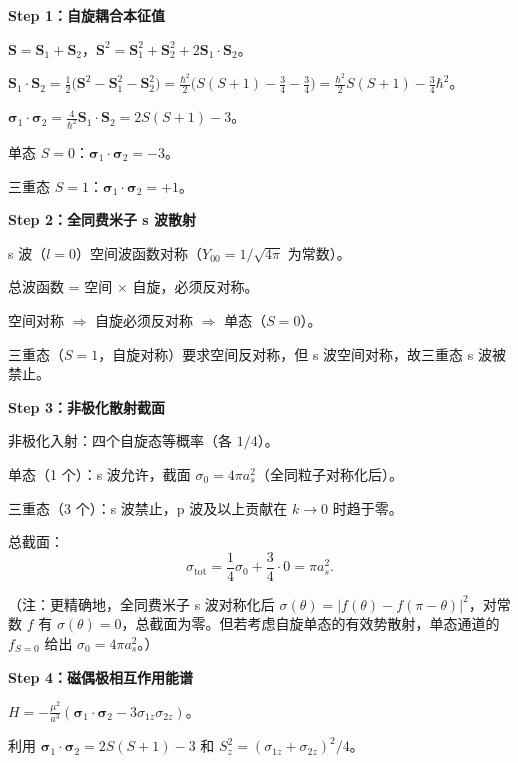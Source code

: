\begin{derivationbox}
\textbf{Step 1：自旋耦合本征值}

$\mathbf{S}=\mathbf{S}_1+\mathbf{S}_2$，$\mathbf{S}^2=\mathbf{S}_1^2+\mathbf{S}_2^2+2\mathbf{S}_1\cdot\mathbf{S}_2$。

$\mathbf{S}_1\cdot\mathbf{S}_2=\frac12\bigl(\mathbf{S}^2-\mathbf{S}_1^2-\mathbf{S}_2^2\bigr)=\frac{\hbar^2}{2}\bigl(S(S+1)-\frac34-\frac34\bigr)=\frac{\hbar^2}{2}S(S+1)-\frac34\hbar^2$。

$\boldsymbol{\sigma}_1\cdot\boldsymbol{\sigma}_2=\frac{4}{\hbar^2}\mathbf{S}_1\cdot\mathbf{S}_2=2S(S+1)-3$。

单态 $S=0$：$\boldsymbol{\sigma}_1\cdot\boldsymbol{\sigma}_2=-3$。

三重态 $S=1$：$\boldsymbol{\sigma}_1\cdot\boldsymbol{\sigma}_2=+1$。

\textbf{Step 2：全同费米子 s 波散射}

s 波（$l=0$）空间波函数对称（$Y_{00}=1/\sqrt{4\pi}$ 为常数）。

总波函数 = 空间 $\times$ 自旋，必须反对称。

空间对称 $\Rightarrow$ 自旋必须反对称 $\Rightarrow$ 单态（$S=0$）。

三重态（$S=1$，自旋对称）要求空间反对称，但 s 波空间对称，故三重态 s 波被禁止。

\textbf{Step 3：非极化散射截面}

非极化入射：四个自旋态等概率（各 $1/4$）。

单态（1 个）：s 波允许，截面 $\sigma_0=4\pi a_s^2$（全同粒子对称化后）。

三重态（3 个）：s 波禁止，p 波及以上贡献在 $k\to0$ 时趋于零。

总截面：
\[
\sigma_{\text{tot}}=\frac14\sigma_0+\frac34\cdot0=\pi a_s^2.
\]

（注：更精确地，全同费米子 s 波对称化后 $\sigma(\theta)=|f(\theta)-f(\pi-\theta)|^2$，对常数 $f$ 有 $\sigma(\theta)=0$，总截面为零。但若考虑自旋单态的有效势散射，单态通道的 $f_{S=0}$ 给出 $\sigma_0=4\pi a_s^2$。）

\textbf{Step 4：磁偶极相互作用能谱}

$H=-\frac{\mu^2}{a^3}(\boldsymbol{\sigma}_1\cdot\boldsymbol{\sigma}_2-3\sigma_{1z}\sigma_{2z})$。

利用 $\boldsymbol{\sigma}_1\cdot\boldsymbol{\sigma}_2=2S(S+1)-3$ 和 $S_z^2=(\sigma_{1z}+\sigma_{2z})^2/4$。


\end{derivationbox}
